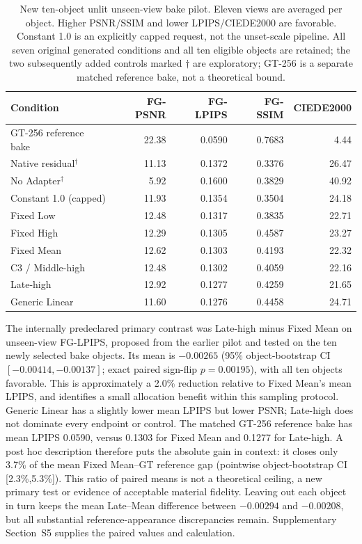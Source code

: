 \documentclass[times,twocolumn,final]{elsarticle}
\begin{document}
\begin{table}[ht]
\centering\scriptsize
\caption{New ten-object unlit unseen-view bake pilot. Eleven views are averaged per object. Higher PSNR/SSIM and lower LPIPS/CIEDE2000 are favorable. Constant 1.0 is an explicitly capped request, not the unset-scale pipeline. All seven original generated conditions and all ten eligible objects are retained; the two subsequently added controls marked $\dagger$ are exploratory; GT-256 is a separate matched reference bake, not a theoretical bound.}
\label{tab:new-bake}
\begin{tabular}{lrrrr}
\toprule Condition & FG-PSNR & FG-LPIPS & FG-SSIM & CIEDE2000 \\
\midrule
GT-256 reference bake & 22.38 & 0.0590 & 0.7683 & 4.44 \\
\midrule
Native residual$^\dagger$ & 11.13 & 0.1372 & 0.3376 & 26.47 \\
No Adapter$^\dagger$ & 5.92 & 0.1600 & 0.3829 & 40.92 \\
Constant 1.0 (capped) & 11.93 & 0.1354 & 0.3504 & 24.18 \\
Fixed Low & 12.48 & 0.1317 & 0.3835 & 22.71 \\
Fixed High & 12.29 & 0.1305 & 0.4587 & 23.27 \\
Fixed Mean & 12.62 & 0.1303 & 0.4193 & 22.32 \\
C3 / Middle-high & 12.48 & 0.1302 & 0.4059 & 22.16 \\
Late-high & 12.92 & 0.1277 & 0.4259 & 21.65 \\
Generic Linear & 11.60 & 0.1276 & 0.4458 & 24.71 \\
\bottomrule\end{tabular}
\end{table}

The internally predeclared primary contrast was Late-high minus Fixed Mean on unseen-view FG-LPIPS, proposed from the earlier pilot and tested on the ten newly selected bake objects. Its mean is $-0.00265$ (95\% object-bootstrap CI $[-0.00414,-0.00137]$; exact paired sign-flip $p=0.00195$), with all ten objects favorable. This is approximately a 2.0\% reduction relative to Fixed Mean's mean LPIPS, and identifies a small allocation benefit within this sampling protocol. Generic Linear has a slightly lower mean LPIPS but lower PSNR; Late-high does not dominate every endpoint or control. The matched GT-256 reference bake has mean LPIPS 0.0590, versus 0.1303 for Fixed Mean and 0.1277 for Late-high. A post hoc description therefore puts the absolute gain in context: it closes only 3.7\% of the mean Fixed Mean--GT reference gap (pointwise object-bootstrap CI [2.3\%,5.3\%]). This ratio of paired means is not a theoretical ceiling, a new primary test or evidence of acceptable material fidelity. Leaving out each object in turn keeps the mean Late--Mean difference between $-0.00294$ and $-0.00208$, but all substantial reference-appearance discrepancies remain. Supplementary Section~S5 supplies the paired values and calculation.
\end{document}
